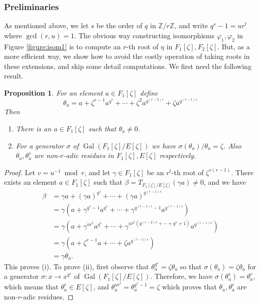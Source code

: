 \documentclass[12pt]{article}
\theoremstyle{plain}
\newtheorem{proposition}[theorem]{Proposition}
\theoremstyle{definition}
\DeclareMathOperator{\gal}{Gal} %
\begin{document}

\subsubsection{Preliminaries}

As mentioned above, we let $s$ be the order of $q$ in $\mathbb{Z} / r\mathbb{Z}$, and write $q^s - 
1 = ur^t$ where $\gcd(r, u) = 1$. The obvious way constructing isomorphisms $\varphi_1, \varphi_2$ 
in Figure \ref{figure:isom1} is to compute an $r$-th root of $\eta$ in $F_1[\zeta], F_2[\zeta]$. 
But, as a more efficient way, we show how to avoid the costly operation of taking roots in these 
extensions, and skip some detail computations. We first need the following result.
\begin{proposition}
	\label{proposition:semi-trace}
	For an element $a \in F_1[\zeta]$ define 
	\begin{equation}
	\label{equation:semi-trace} 
	\theta_a = a + \zeta^{r - 1}a^{q^s} + \cdots + \zeta^2a^{q^{(r - 2)s}} + \zeta a^{q^{(r - 1)s}}
	\end{equation}
	Then
	\begin{enumerate}
		\item[\normalfont (i)] There is an $a \in F_1[\zeta]$ such that $\theta_a \ne 0$.
		\item[\normalfont (ii)] For a generator $\sigma$ of $\gal(F_1[\zeta] / E[\zeta])$ we have 
		$\sigma(\theta_a) / \theta_a = \zeta$. Also $\theta_a, \theta_a^r$ are non-$r$-adic 
		residues in $F_1[\zeta], E[\zeta]$ respectively.
	\end{enumerate}
\end{proposition}
\begin{proof}
	Let $v = u^{-1} \bmod r$, and let $\gamma \in F_1[\zeta]$ be an $r^t$-th root of $\zeta^{v(r - 
	1)}$. There exists an element $a \in F_1[\zeta]$ such that $\beta = T_{F_1[\zeta] / 
	E[\zeta]}(\gamma a) \ne 0$, and we have 
	\begin{equation}
		\label{equation:trace}
		\begin{aligned}
		\beta 
		& = \gamma a + (\gamma a)^{q^s} + \cdots + (\gamma a)^{q^{(r - 1)s}} \\
		& = \gamma (a + \gamma^{q^s - 1}a^{q^s} + \cdots + \gamma^{q^{(r - 1)s} - 1}a^{q^{(r - 
		1)s}}) \\
		& = \gamma (a + \gamma^{ur^t}a^{q^s} + \cdots + \gamma^{ur^t(q^{(r - 2)s} + \cdots + q^s + 
		1)}a^{q^{(r - 1)s}}) \\
		& = \gamma (a + \zeta^{r - 1}a + \cdots + \zeta a^{q^{(r - 1)s}}) \\
		& = \gamma \theta_a.
		\end{aligned}
	\end{equation}
	This proves (i). To prove (ii), first observe that $\theta_a^{q^s} = \zeta\theta_a$ so that 
	$\sigma(\theta_a) = \zeta\theta_a$ for a generator $\sigma: x \to x^{q^s}$ of $\gal(F_1[\zeta] 
	/ E[\zeta])$. Therefore, we have $\sigma(\theta_a^r) = \theta_a^r$, which means that 
	$\theta_a^r \in E[\zeta]$, and $\theta_a^{ur^t} = \theta_a^{q^s - 1} = \zeta$ which proves 
	that $\theta_a, \theta_a^r$ are non-$r$-adic residues.
\end{proof}
\end{document}
